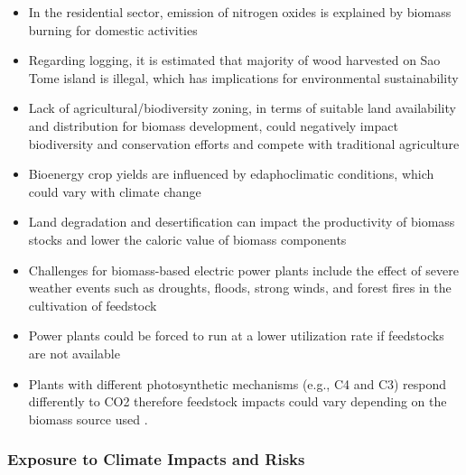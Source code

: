 \documentclass[
]{book}
\providecommand{\tightlist}{%
  \setlength{\itemsep}{0pt}\setlength{\parskip}{0pt}}
\begin{document}
\begin{itemize}
\tightlist
\item
  In the residential sector, emission of nitrogen oxides is explained by biomass burning for domestic activities
\item
  Regarding logging, it is estimated that majority of wood harvested on Sao Tome island is illegal, which has implications for environmental sustainability
\item
  Lack of agricultural/biodiversity zoning, in terms of suitable land availability and distribution for biomass development, could negatively impact biodiversity and conservation efforts and compete with traditional agriculture
\item
  Bioenergy crop yields are influenced by edaphoclimatic conditions, which could vary with climate change
\item
  Land degradation and desertification can impact the productivity of biomass stocks and lower the caloric value of biomass components
\item
  Challenges for biomass-based electric power plants include the effect of severe weather events such as droughts, floods, strong winds, and forest fires in the cultivation of feedstock
\item
  Power plants could be forced to run at a lower utilization rate if feedstocks are not available
\item
  Plants with different photosynthetic mechanisms (e.g., C4 and C3) respond differently to CO2 therefore feedstock impacts could vary depending on the biomass source used .
\end{itemize}

\hypertarget{exposure-to-climate-impacts-and-risks-14}{%
\subsubsection{Exposure to Climate Impacts and Risks}\label{exposure-to-climate-impacts-and-risks-14}}
\end{document}
